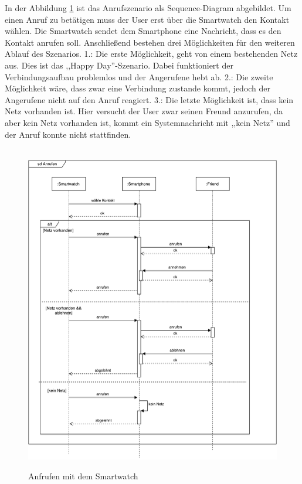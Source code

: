 In der Abbildung \ref{fig:anruf} ist das Anrufszenario als Sequence-Diagram abgebildet.
Um einen Anruf zu betätigen muss der User erst über die Smartwatch den Kontakt wählen. Die Smartwatch sendet dem Smartphone eine Nachricht, dass es den Kontakt anrufen soll. Anschließend bestehen drei Möglichkeiten für den weiteren Ablauf des Szenarios.
1.: Die erste Möglichkeit, geht von einem bestehenden Netz aus. Dies ist das ,,Happy Day''-Szenario. Dabei funktioniert der Verbindungsaufbau problemlos und der Angerufene hebt ab.
2.: Die zweite Möglichkeit wäre, dass zwar eine Verbindung zustande kommt, jedoch der Angerufene nicht auf den Anruf reagiert.
3.: Die letzte Möglichkeit ist, dass kein Netz vorhanden ist. Hier versucht der User zwar seinen Freund anzurufen, da aber kein Netz vorhanden ist, kommt ein Systemnachricht mit ,,kein Netz'' und der Anruf konnte nicht stattfinden.
\begin{figure}[h]
\centering\
\includegraphics[width=13cm]{img/AnrufenSequenz}
\caption{Anfrufen mit dem Smartwatch}\label{fig:anruf}
\end{figure}




